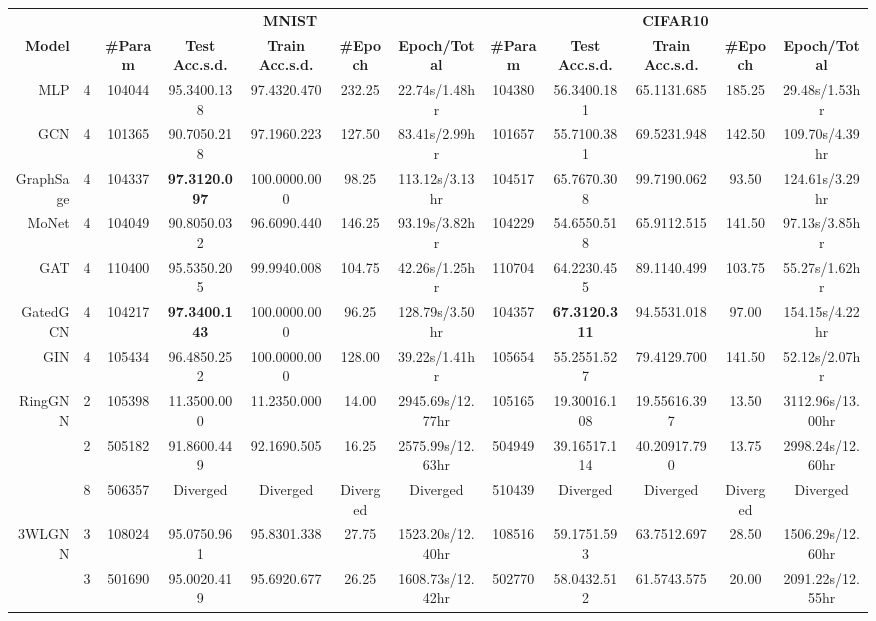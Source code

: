 \documentclass{article}
\newcommand{\best}[1]{{\color{red}\textbf{#1}}}
\newcommand{\good}[1]{{\color{violet}#1}}
\begin{document}
\begin{table}[t!]
{\begin{tabular}{rr|ccccc|ccccc}
        & & \multicolumn{5}{c}{\textbf{MNIST}} & \multicolumn{5}{c}{\textbf{CIFAR10}}\\
        \textbf{Model} & \textbf{} & \textbf{\#Param} & \textbf{Test Acc.s.d.} & \textbf{Train Acc.s.d.} & \textbf{\#Epoch} & \textbf{Epoch/Total} & \textbf{\#Param} & \textbf{Test Acc.s.d.} & \textbf{Train Acc.s.d.} & \textbf{\#Epoch} & \textbf{Epoch/Total} \\
        \midrule
        \midrule
        MLP & 4 & 104044 & 95.3400.138 & 97.4320.470 & 232.25 & 22.74s/1.48hr & 104380 & 56.3400.181 & 65.1131.685 & 185.25 & 29.48s/1.53hr\\
        \midrule
        GCN & 4 & 101365 & 90.7050.218 & 97.1960.223 & 127.50 & 83.41s/2.99hr & 101657 & 55.7100.381 & 69.5231.948 & 142.50 & 109.70s/4.39hr\\
        GraphSage & 4 & 104337 & \best{97.3120.097} & 100.0000.000 & 98.25 & 113.12s/3.13hr & 104517 & \good{65.7670.308} & 99.7190.062 & 93.50 & 124.61s/3.29hr\\
        \midrule
MoNet & 4 & 104049 & 90.8050.032 & 96.6090.440 & 146.25 & 93.19s/3.82hr & 104229 & 54.6550.518 & 65.9112.515 & 141.50 & 97.13s/3.85hr\\
        GAT & 4 & 110400 & 95.5350.205 & 99.9940.008 & 104.75 & 42.26s/1.25hr & 110704 & 64.2230.455 & 89.1140.499 & 103.75 & 55.27s/1.62hr\\
        GatedGCN & 4 & 104217 & \best{97.3400.143} & 100.0000.000 & 96.25 & 128.79s/3.50hr & 104357 & \best{67.3120.311} & 94.5531.018 & 97.00 & 154.15s/4.22hr\\
\midrule
        GIN & 4 & 105434 & \good{96.4850.252} & 100.0000.000 & 128.00 & 39.22s/1.41hr & 105654 & 55.2551.527 & 79.4129.700 & 141.50 & 52.12s/2.07hr\\
        RingGNN & 2 & 105398 & 11.3500.000 & 11.2350.000 & 14.00 & 2945.69s/12.77hr & 105165 & 19.30016.108 & 19.55616.397 & 13.50 & 3112.96s/13.00hr\\
        & 2 & 505182 & 91.8600.449 & 92.1690.505 & 16.25 & 2575.99s/12.63hr & 504949 & 39.16517.114 & 40.20917.790 & 13.75 & 2998.24s/12.60hr \\
        & 8 & 506357 & Diverged & Diverged & Diverged & Diverged & 510439 & Diverged & Diverged & Diverged & Diverged\\
        3WLGNN & 3 & 108024 & 95.0750.961 & 95.8301.338 & 27.75 & 1523.20s/12.40hr & 108516 & 59.1751.593 & 63.7512.697 & 28.50 & 1506.29s/12.60hr \\
        & 3 & 501690 & 95.0020.419 & 95.6920.677 & 26.25 & 1608.73s/12.42hr & 502770 & 58.0432.512 & 61.5743.575 & 20.00 & 2091.22s/12.55hr\\

\end{tabular}}
\end{table}
\end{document}
